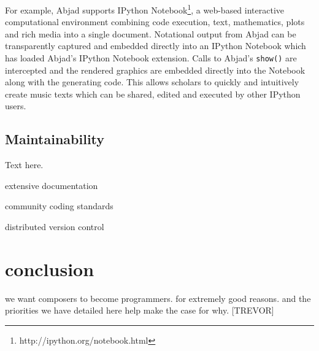 \documentclass{article}
\begin{document}
For example, Abjad supports IPython
Notebook\footnote{http://ipython.org/notebook.html}, a web-based interactive
computational environment combining code execution, text, mathematics, plots
and rich media into a single document. Notational output from Abjad can be
transparently captured and embedded directly into an IPython Notebook which has
loaded Abjad's IPython Notebook extension. Calls to Abjad's \texttt{show()} are
intercepted and the rendered graphics are embedded directly into the Notebook
along with the generating code. This allows scholars to quickly and intuitively
create music texts which can be shared, edited and executed by other IPython
users.

\subsection{Maintainability}

Text here.

extensive documentation

community coding standards

distributed version control

\section{conclusion} \label{sec:conclusion}

we want composers to become programmers. for extremely good reasons. and the
priorities we have detailed here help make the case for why. [TREVOR]


\end{document}
